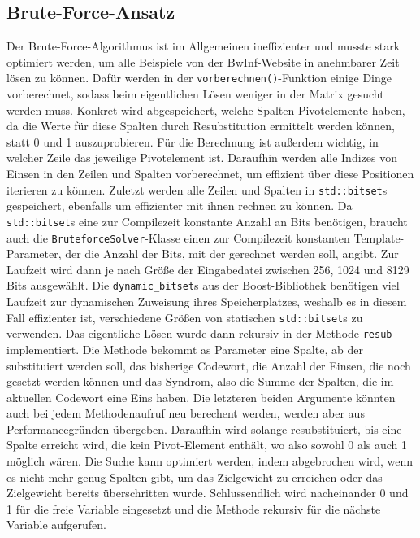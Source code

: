 \documentclass[a4paper,10pt,ngerman]{scrartcl}
\begin{document}
\subsection{Brute-Force-Ansatz}
Der Brute-Force-Algorithmus ist im Allgemeinen ineffizienter und musste stark optimiert werden, um alle Beispiele von der BwInf-Website in anehmbarer Zeit lösen zu können. 
Dafür werden in der \lstinline{vorberechnen()}-Funktion einige Dinge vorberechnet, sodass beim eigentlichen Lösen weniger in der Matrix gesucht werden muss. 
Konkret wird abgespeichert, welche Spalten Pivotelemente haben, da die Werte für diese Spalten durch Resubstitution ermittelt werden können, statt 0 und 1 auszuprobieren. 
Für die Berechnung ist außerdem wichtig, in welcher Zeile das jeweilige Pivotelement ist. 
Daraufhin werden alle Indizes von Einsen in den Zeilen und Spalten vorberechnet, um effizient über diese Positionen iterieren zu können. 
Zuletzt werden alle Zeilen und Spalten in \lstinline{std::bitset}s gespeichert, ebenfalls um effizienter mit ihnen rechnen zu können.
Da \lstinline{std::bitset}s eine zur Compilezeit konstante Anzahl an Bits benötigen, braucht auch die \lstinline{BruteforceSolver}-Klasse einen zur Compilezeit konstanten Template-Parameter, der die Anzahl der Bits, mit der gerechnet werden soll, angibt.  
Zur Laufzeit wird dann je nach Größe der Eingabedatei zwischen 256, 1024 und 8129 Bits ausgewählt. 
Die \lstinline{dynamic_bitset}s aus der Boost-Bibliothek benötigen viel Laufzeit zur dynamischen Zuweisung ihres Speicherplatzes, weshalb es in diesem Fall effizienter ist, verschiedene Größen von statischen \lstinline{std::bitset}s zu verwenden.
Das eigentliche Lösen wurde dann rekursiv in der Methode \lstinline{resub} implementiert.
Die Methode bekommt as Parameter eine Spalte, ab der substituiert werden soll, das bisherige Codewort, die Anzahl der Einsen, die noch gesetzt werden können und das Syndrom, also die Summe der Spalten, die im aktuellen Codewort eine Eins haben. 
Die letzteren beiden Argumente könnten auch bei jedem Methodenaufruf neu berechent werden, werden aber aus Performancegründen übergeben. 
Daraufhin wird solange resubstituiert, bis eine Spalte erreicht wird, die kein Pivot-Element enthält, wo also sowohl 0 als auch 1 möglich wären.
Die Suche kann optimiert werden, indem abgebrochen wird, wenn es nicht mehr genug Spalten gibt, um das Zielgewicht zu erreichen oder das Zielgewicht bereits überschritten wurde. 
Schlussendlich wird nacheinander 0 und 1 für die freie Variable eingesetzt und die Methode rekursiv für die nächste Variable aufgerufen. 
\end{document}
